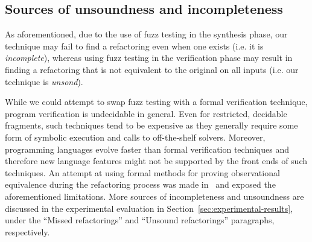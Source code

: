 \documentclass[sigconf,review,anonymous]{acmart}
\begin{document}







\subsection{Sources of unsoundness and incompleteness}\label{sec:incompleteness}
As aforementioned, due to the use of fuzz
testing in the synthesis phase, our technique may fail to find a
refactoring even when one exists (i.e. it is {\em incomplete}),
whereas using fuzz testing in the verification phase may result in
finding a refactoring that is not equivalent to the original on all
inputs (i.e. our technique is {\em unsond}).

While we could attempt to swap fuzz testing with a formal verification technique,
program verification is undecidable in general.
Even for restricted, decidable fragments, such
techniques tend to be expensive as they generally require some form of
symbolic execution and calls to off-the-shelf solvers.  Moreover,
programming languages evolve faster than formal verification techniques and
therefore new language features might not be supported by the front ends of
such techniques. An attempt at using formal methods for proving
observational equivalence during the refactoring process was made in~\cite{DBLP:journals/corr/abs-1712-07388} and exposed the aforementioned limitations.
%
More sources of incompleteness and unsoundness are discussed in the experimental evaluation in Section~\ref{sec:experimental-results},
under the ``Missed refactorings'' and ``Unsound refactorings'' paragraphs, respectively.


\end{document}
